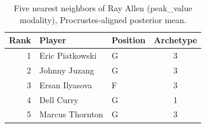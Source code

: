 \begin{table}[htbp]
  \centering\small
  \begin{tabular}{rllc}
    \toprule
    Rank & Player & Position & Archetype \\
    \midrule
    1 & Eric Piatkowski & G & 3 \\
    2 & Johnny Juzang & G & 3 \\
    3 & Ersan Ilyasova & F & 3 \\
    4 & Dell Curry & G & 1 \\
    5 & Marcus Thornton & G & 3 \\
    \bottomrule
  \end{tabular}
  \caption{Five nearest neighbors of Ray Allen (peak_value modality), Procrustes-aligned posterior mean.}
  \label{tab:Ray_Allen_neighbors_peak_value}
\end{table}

